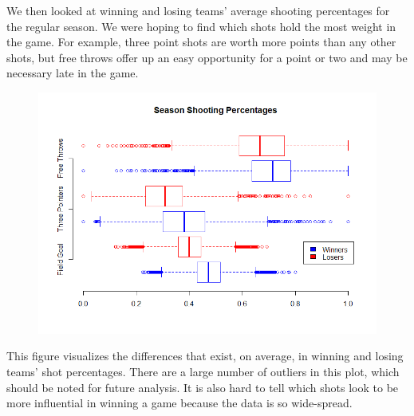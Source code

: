 \documentclass[]{scrartcl}
\begin{document}
We then looked at winning and losing teams' average shooting percentages for the regular season. We were hoping to find which shots hold the most weight in the game. For example, three point shots are worth more points than any other shots, but free throws offer up an easy opportunity for a point or two and may be necessary late in the game.
\begin{figure}[H]
	\centering
	\includegraphics[scale=.5]{SeasonShotPercent.png}
\end{figure}
This figure visualizes the differences that exist, on average, in winning and losing teams' shot percentages. There are a large number of outliers in this plot, which should be noted for future analysis. It is also hard to tell which shots look to be more influential in winning a game because the data is so wide-spread.
\end{document}
